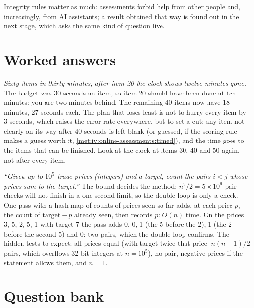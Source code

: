 Integrity rules matter as much: assessments forbid help from other people and, increasingly, from AI
assistants; a result obtained that way is found out in the next stage, which asks the same kind of question
live.

\section{Worked answers}

\begin{example}\label{ex:iv:online-assessments:behind}
\emph{Sixty items in thirty minutes; after item 20 the clock shows twelve minutes gone.} The budget was 30 seconds an
item, so item 20 should have been done at ten minutes: you are two minutes behind. The remaining 40 items now have
18 minutes, 27 seconds each. The plan that loses least is not to hurry every item by 3 seconds, which raises the error
rate everywhere, but to set a cut: any item not clearly on its way after 40 seconds is left blank (or guessed, if the
scoring rule makes a guess worth it, \cref{met:iv:online-assessments:timed}), and the time goes to the items that can be
finished. Look at the clock at items 30, 40 and 50 again, not after every item.
\end{example}

\begin{example}\label{ex:iv:online-assessments:pairs}
\emph{``Given up to $10^5$ trade prices (integers) and a target, count the pairs $i < j$ whose prices sum to the
target.''} The bound decides the method: $n^2/2 = 5 \times 10^9$ pair checks will not finish in a one-second limit, so
the double loop is only a check. One pass with a hash map of counts of prices seen so far adds, at each price $p$, the
count of $\text{target} - p$ already seen, then records $p$: $O(n)$ time. On the prices 3, 5, 2, 5, 1 with target 7 the
pass adds 0, 0, 1 (the 5 before the 2), 1 (the 2 before the second 5) and 0: two pairs, which the double loop confirms.
The hidden tests to expect: all prices equal (with target twice that price, $n(n-1)/2$ pairs, which overflows 32-bit
integers at $n = 10^5$), no pair, negative prices if the statement allows them, and $n = 1$.
\end{example}

\section{Question bank}

